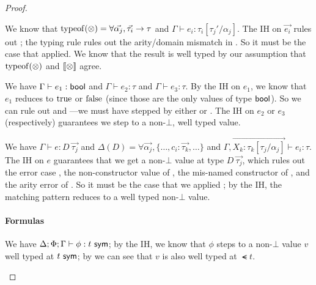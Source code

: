 \documentclass[acmsmall,screen,nonacm]{acmart}
\theoremstyle{definition}
\begin{document}
\begin{lemma}
\begin{proof}
\begin{proofcases}
  \item[(\rn{$e$-Op})] We know that $\mathrm{typeof}(\otimes)
  = \forall \vec{\alpha_j}, \vec{\tau_i} \rightarrow \tau$ and
  $\Gamma \vdash e_i : \tau_i[\tau_j'/\alpha_j]$. The IH on
  $\vec{e_i}$ rules out ; the typing rule rules
  out the arity/domain mismatch in . So it must
  be the case that  applied. We know that the
  result is well typed by our assumption that $\mathrm{typeof}(\otimes)$ and
  $[ \! [\otimes] \! ]$ agree.

  \item[(\rn{$e$-If})] We have $\Gamma \vdash e_1 : \mathsf{bool}$ and
      $\Gamma \vdash e_2 : \tau$ and $\Gamma \vdash e_3 : \tau$.
%
  By the IH on $e_1$, we know that $e_1$ reduces to $\mathrm{true}$ or
  $\mathrm{false}$ (since those are the only values of type $\mathsf{bool}$). So we
  can rule out 
  and ---we must have stepped by
  either  or .
%
  The IH on $e_2$ or $e_3$ (respectively) guarantees we step to a
  non-$\bot$, well typed value.

  \item[(\rn{$e$-Match})] We have $\Gamma \vdash e : D ~ \vec{\tau_j}$
  and $\Delta(D) = \forall \vec{\alpha_j}, \{ \dots, c_i
  : \vec{\tau_k}, \dots \}$ and
  $ \Gamma,\overrightarrow{X_k:\tau_k[\tau_j/\alpha_j]} \vdash e_i
  : \tau$. 
%
  The IH on $e$ guarantees that we get a non-$\bot$ value at type $D
  ~ \vec{\tau_j}$, which rules out the error
  case , the non-constructor value
  of , the mis-named constructor
  of , and the arity error
  of .
%
  So it must be the case that we applied ; by
  the IH, the matching pattern reduces to a well typed non-$\bot$
  value.

\end{proofcases}

  \paragraph*{Formulas}

\begin{proofcases}

  \item[(\rn{$\phi$-Promote})] We have
  $\Delta; \Phi; \Gamma \vdash \phi : {t} ~ \mathsf{sym}$; by the IH, we know
  that $\phi$ steps to a non-$\bot$ value $v$ well typed at ${t} ~ \mathsf{sym}$;
  by  we can see that $v$ is also well typed at
  $\smt{t}$.


\end{proofcases}
\end{proof}
\end{lemma}
\end{document}
